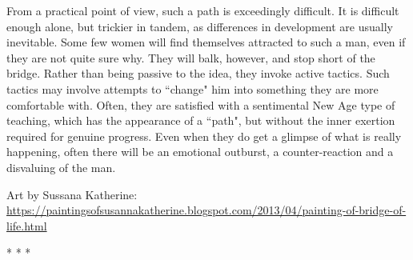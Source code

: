 From a practical point of view, such a path is exceedingly difficult. It is difficult enough alone, but trickier in tandem, as differences in development are usually inevitable. Some few women will find themselves attracted to such a man, even if they are not quite sure why. They will balk, however, and stop short of the bridge. Rather than being passive to the idea, they invoke active tactics. Such tactics may involve attempts to ``change" him into something they are more comfortable with. Often, they are satisfied with a sentimental New Age type of teaching, which has the appearance of a ``path", but without the inner exertion required for genuine progress. Even when they do get a glimpse of what is really happening, often there will be an emotional outburst, a counter-reaction and a disvaluing of the man.

Art by Sussana Katherine: \url{https://paintingsofsusannakatherine.blogspot.com/2013/04/painting-of-bridge-of-life.html}


\begin{center}* * *\end{center}

